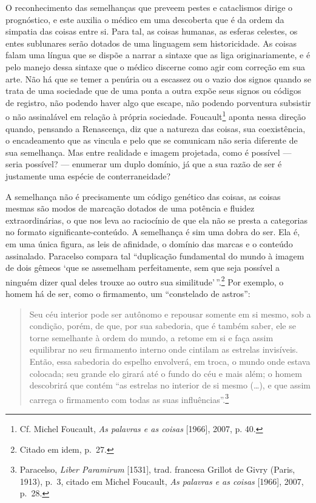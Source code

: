 O reconhecimento das semelhanças que preveem pestes e cataclismos dirige
o prognóstico, e este auxilia o médico em uma descoberta que é da ordem
da simpatia das coisas entre si. Para tal, as coisas humanas, as esferas
celestes, os entes sublunares serão dotados de uma linguagem sem
historicidade. As coisas falam uma língua que se dispõe a narrar a
sintaxe que as liga originariamente, e é pelo manejo dessa sintaxe que o
médico discerne como agir com correção em sua arte. Não há que se temer
a penúria ou a escassez ou o vazio dos signos quando se trata de uma
sociedade que de uma ponta a outra expõe seus signos ou códigos de
registro, não podendo haver algo que escape, não podendo porventura
subsistir o não assinalável em relação à própria sociedade.
Foucault\footnote{Cf. Michel Foucault, \textit{As palavras e as coisas}
  {[}1966{]}, 2007, p. 40.} aponta nessa direção quando, pensando a
Renascença, diz que a natureza das coisas, sua coexistência, o
encadeamento que as vincula e pelo que se comunicam não seria diferente
de sua semelhança. Mas entre realidade e imagem projetada, como é
possível --- seria possível? --- enumerar um duplo domínio, já que a sua
razão de ser é justamente uma espécie de conterraneidade?

A semelhança não é precisamente um código genético das coisas, as coisas
mesmas são modos de marcação dotados de uma potência e fluidez
extraordinárias, o que nos leva ao raciocínio de que ela não se presta a
categorias no formato significante-conteúdo. A semelhança é sim uma
dobra do ser. Ela é, em uma única figura, as leis de afinidade, o
domínio das marcas e o conteúdo assinalado. Paracelso compara tal
``duplicação fundamental do mundo à imagem de dois gêmeos `que se
assemelham perfeitamente, sem que seja possível a ninguém dizer qual
deles trouxe ao outro sua similitude'\,''.\footnote{Citado em idem,
  p.~27.} Por exemplo, o homem há de ser, como o firmamento, um
``constelado de astros'':

\begin{quote}
Seu céu interior pode ser autônomo e repousar somente em si mesmo, sob a
condição, porém, de que, por sua sabedoria, que é também saber, ele se
torne semelhante à ordem do mundo, a retome em si e faça assim
equilibrar no seu firmamento interno onde cintilam as estrelas
invisíveis. Então, essa sabedoria do espelho envolverá, em troca, o
mundo onde estava colocada; seu grande elo girará até o fundo do céu e
mais além; o homem descobrirá que contém ``as estrelas no interior de si
mesmo (\dots{}), e que assim carrega o firmamento com todas as suas
influências''.\footnote{Paracelso, \textit{Liber Paramirum} {[}1531{]},
  trad. francesa Grillot de Givry (Paris, 1913), p.~3, citado em Michel
  Foucault, \textit{As palavras e as coisas} {[}1966{]}, 2007, p.~28.}
\end{quote}

